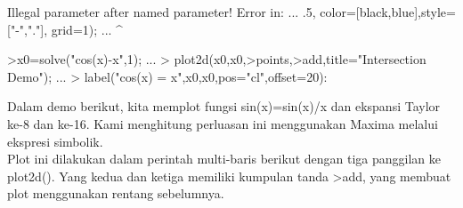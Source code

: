 \documentclass[a4paper,10pt]{article}
\begin{document}
\begin{eulernotebook}
\begin{eulercomment}
\begin{eulercomment}
\begin{eulercomment}
\begin{eulercomment}
\begin{eulercomment}
\begin{eulercomment}
\begin{eulercomment}
\begin{eulercomment}
\begin{eulercomment}
\begin{eulercomment}
\begin{eulercomment}
\begin{eulercomment}
\begin{eulercomment}
\begin{eulercomment}
\begin{eulercomment}
\begin{eulercomment}
\begin{eulercomment}
\begin{eulercomment}
\begin{eulercomment}
\begin{eulercomment}
\begin{eulercomment}
\begin{eulercomment}
\begin{eulercomment}
\begin{eulercomment}
\begin{eulercomment}
\begin{eulercomment}
\begin{eulercomment}
\begin{eulercomment}
\begin{eulercomment}
\begin{eulercomment}
\begin{eulercomment}
\begin{eulercomment}
\begin{eulercomment}
\begin{eulercomment}
\begin{eulercomment}
\begin{eulercomment}
\begin{euleroutput}
  Illegal parameter after named parameter!
  Error in:
  ... .5,  color=[black,blue],style=["-","."],  grid=1); ...
                                                       ^
\end{euleroutput}
\begin{eulerprompt}
>x0=solve("cos(x)-x",1);  ...
> plot2d(x0,x0,>points,>add,title="Intersection Demo");  ...
>  label("cos(x) = x",x0,x0,pos="cl",offset=20):
\end{eulerprompt}
\begin{eulercomment}
Dalam demo berikut, kita memplot fungsi sin(x)=sin(x)/x dan ekspansi
Taylor ke-8 dan ke-16. Kami menghitung perluasan ini menggunakan
Maxima melalui ekspresi simbolik.\\
Plot ini dilakukan dalam perintah multi-baris berikut dengan tiga
panggilan ke plot2d(). Yang kedua dan ketiga memiliki kumpulan tanda
\textgreater{}add, yang membuat plot menggunakan rentang sebelumnya.


\end{eulercomment}
\end{eulercomment}
\end{eulercomment}
\end{eulercomment}
\end{eulercomment}
\end{eulercomment}
\end{eulercomment}
\end{eulercomment}
\end{eulercomment}
\end{eulercomment}
\end{eulercomment}
\end{eulercomment}
\end{eulercomment}
\end{eulercomment}
\end{eulercomment}
\end{eulercomment}
\end{eulercomment}
\end{eulercomment}
\end{eulercomment}
\end{eulercomment}
\end{eulercomment}
\end{eulercomment}
\end{eulercomment}
\end{eulercomment}
\end{eulercomment}
\end{eulercomment}
\end{eulercomment}
\end{eulercomment}
\end{eulercomment}
\end{eulercomment}
\end{eulercomment}
\end{eulercomment}
\end{eulercomment}
\end{eulercomment}
\end{eulercomment}
\end{eulercomment}
\end{eulercomment}
\end{eulernotebook}
\end{document}
